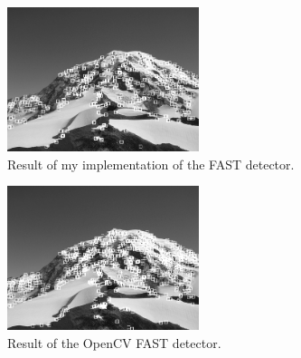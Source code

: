\documentclass[a4paper,twocolumn]{article}
\begin{document}
\begin{figure}[h]
	\centering\includegraphics[width=0.5\textwidth]{images/fast/my_fast.png}
	\caption{Result of my implementation of the FAST detector.}
	\label{my_fast}
\end{figure}

\begin{figure}[h]
	\centering\includegraphics[width=0.5\textwidth]{images/fast/opencv_fast.png}
	\caption{Result of the OpenCV FAST detector.}
	\label{opencv_fast}
\end{figure}
\end{document}
